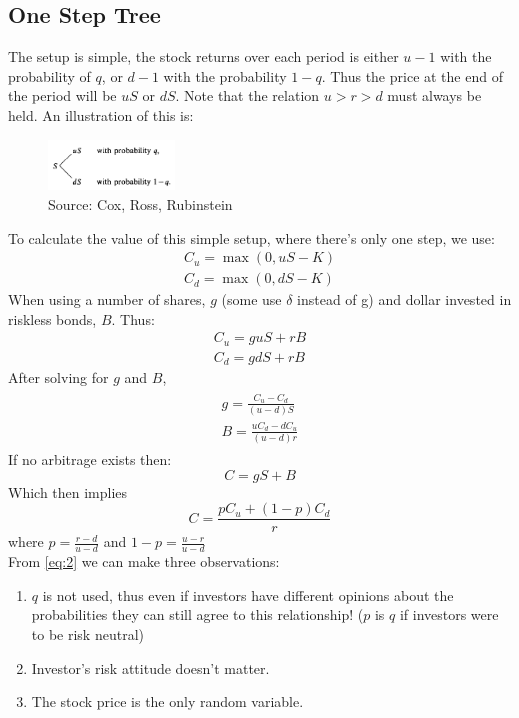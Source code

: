 \documentclass{article}
\begin{document}
\subsection{One Step Tree}
The setup is simple, the stock returns over each period is either $u - 1$ with the probability of $q$, or $d - 1$ with the probability $1 - q$. Thus the price at the end of the period will be $uS$ or $dS$. Note that the relation $u > r > d$ must always be held. An illustration of this is:

\begin{figure}
\centering
\includegraphics[width=0.3\textwidth]{one-step-tree.png}
\caption{\label{fig:onestep}Source: Cox, Ross, Rubinstein}
\end{figure}

To calculate the value of this simple setup, where there’s only one step, we use:
\begin{align*}
    C_{u} = \max(0, uS - K) \\
    C_{d} = \max(0, dS - K)
\end{align*}
When using a number of shares, $g$ (some use $\delta$ instead of g) and dollar invested in riskless bonds, $B$. Thus:
\begin{align*}
    C_{u} = g u S + r B \\
    C_{d} = g d S + r B 
\end{align*}
After solving for $g$ and $B$,
\begin{align}\label{eq:1}
    \begin{split}
    g = \frac{C_{u} - C_{d}}{(u - d)S} \\
    B = \frac{uC_{d} - dC_{u}}{(u - d)r}
    \end{split}
\end{align}
If no arbitrage exists then:
\begin{equation*}
    C = gS +B
\end{equation*}
Which then implies
\begin{equation}\label{eq:2}
    C = \frac{p C_{u} + (1 - p) C_{d}}{r}
\end{equation}
where $p=\frac{r-d}{u-d}$ and $1-p=\frac{u-r}{u-d}$ \\ [5ex]
From \ref{eq:2} we can make three observations:
\begin{enumerate}
    \item $q$ is not used, thus even if investors have different opinions about the probabilities they can still agree to this relationship! ($p$ is $q$ if investors were to be risk neutral)
    \item Investor’s risk attitude doesn’t matter.
    \item The stock price is the only random variable.
\end{enumerate}
\end{document}
